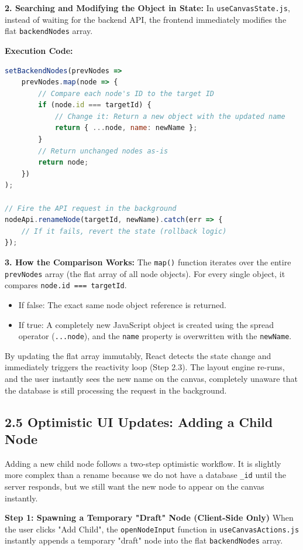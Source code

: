 \documentclass[12pt, a4paper]{article}
\begin{document}
\textbf{2. Searching and Modifying the Object in State:}
In \texttt{useCanvasState.js}, instead of waiting for the backend API, the frontend immediately modifies the flat \texttt{backendNodes} array. 

\textbf{Execution Code:}
\begin{lstlisting}[language=javascript, caption={useCanvasState.js - Optimistic Rename}]
setBackendNodes(prevNodes => 
    prevNodes.map(node => {
        // Compare each node's ID to the target ID
        if (node.id === targetId) {
            // Change it: Return a new object with the updated name
            return { ...node, name: newName };
        }
        // Return unchanged nodes as-is
        return node;
    })
);

// Fire the API request in the background
nodeApi.renameNode(targetId, newName).catch(err => {
    // If it fails, revert the state (rollback logic)
});
\end{lstlisting}

\textbf{3. How the Comparison Works:}
The \texttt{map()} function iterates over the entire \texttt{prevNodes} array (the flat array of all node objects). For every single object, it compares \texttt{node.id === targetId}.
\begin{itemize}
    \item If false: The exact same node object reference is returned.
    \item If true: A completely new JavaScript object is created using the spread operator (\texttt{...node}), and the \texttt{name} property is overwritten with the \texttt{newName}.
\end{itemize}

By updating the flat array immutably, React detects the state change and immediately triggers the reactivity loop (Step 2.3). The layout engine re-runs, and the user instantly sees the new name on the canvas, completely unaware that the database is still processing the request in the background.

\subsection{2.5 Optimistic UI Updates: Adding a Child Node}
Adding a new child node follows a two-step optimistic workflow. It is slightly more complex than a rename because we do not have a database \texttt{\_id} until the server responds, but we still want the new node to appear on the canvas instantly.

\textbf{Step 1: Spawning a Temporary "Draft" Node (Client-Side Only)}
When the user clicks "Add Child", the \texttt{openNodeInput} function in \texttt{useCanvasActions.js} instantly appends a temporary "draft" node into the flat \texttt{backendNodes} array. 
\end{document}
